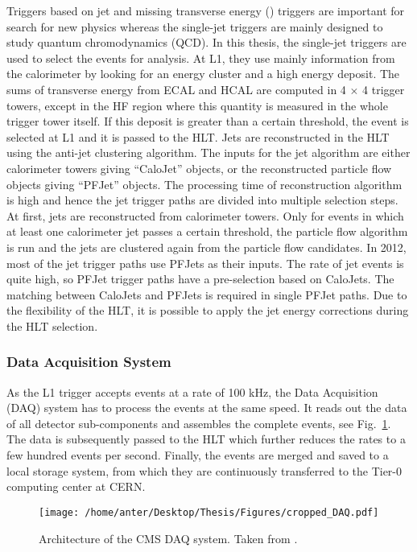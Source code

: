 Triggers based on jet and missing transverse energy (\ETmiss) triggers are important for search for new physics whereas the single-jet triggers are mainly designed to study quantum chromodynamics (QCD). In this thesis, the single-jet triggers are used to select the events for analysis. At L1, they use mainly information from the calorimeter by looking for an energy cluster and a high energy deposit. The sums of transverse energy from ECAL and HCAL are computed in 4 $\times$ 4 trigger towers, except in the HF region where this quantity is measured in the whole trigger tower itself. If this deposit is greater than a certain threshold, the event is selected at L1 and it is passed to the HLT. Jets are reconstructed in the HLT using the anti-\kt jet clustering algorithm. The inputs for the jet algorithm are either calorimeter towers giving ``CaloJet'' objects, or the reconstructed particle flow objects giving ``PFJet'' objects. The processing time of reconstruction algorithm is high and hence the jet trigger paths are divided into multiple selection steps. At first, jets are reconstructed from calorimeter towers. Only for events in which at least one calorimeter jet passes a certain \pt threshold, the particle flow algorithm is run and the jets are clustered again from the particle flow candidates. In 2012, most of the jet trigger paths use PFJets as their inputs. The rate of jet events is quite high, so PFJet trigger paths have a pre-selection based on CaloJets. The matching between CaloJets and PFJets is required in single PFJet paths. Due to the flexibility of the HLT, it is possible to apply the jet energy corrections during the HLT selection.

\subsubsection{Data Acquisition System}
As the L1 trigger accepts events at a rate of 100 kHz, the Data Acquisition (DAQ) system has to process the events at the same speed. It reads out the data of all detector sub-components and assembles the complete events, see Fig.~\ref{fig:DAQ}. The data is subsequently passed to the HLT which further reduces the rates to a few hundred events per second. Finally, the events are merged and saved to a local storage system, from which they are continuously transferred to the Tier-0 computing center at CERN.

\begin{figure}[!h]
\begin{center}
\vspace*{3mm} 
\hspace*{-5mm}
\texttt{[image: /home/anter/Desktop/Thesis/Figures/cropped\_DAQ.pdf]}\\
\vspace*{4mm}
\caption[Architecture of the CMS DAQ system.]{Architecture of the CMS DAQ system. Taken from \cite{Chatrchyan:2008aa}.}
\label{fig:DAQ}
\end{center}
\end{figure}

